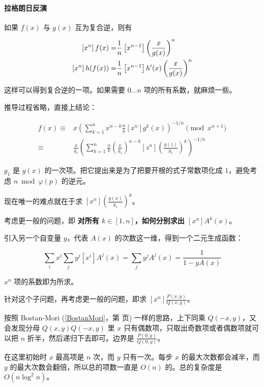 \paragraph{拉格朗日反演} 如果 $f(x)$ 与 $g(x)$ 互为复合逆，则有

$$ \begin{aligned}\relax \left[x^n\right]f(x)=&\frac{1}{n}\left[x^{n-1}\right]\left(\frac{x}{g(x)}\right)^n \\
\relax \left[x^n\right]h(f(x))=&\frac{1}{n}\left[x^{n-1}\right]h'(x)\left(\frac{x}{g(x)}\right)^n\end{aligned} $$

这样可以得到复合逆的一项。如果需要 $0 \dots n$ 项的所有系数，就麻烦一些。

推导过程省略，直接上结论：

$$ \begin{aligned}
f(x) \equiv & x \left( \sum_{k = 1} ^ n x^{n - k} \frac n k \left[ x^n \right] g^k(x) \right) ^ {- 1 / n} \pmod {x^{n + 1}} \\
\equiv & \frac x {g_1} \left( \sum_{k = 1} ^ n \frac n k \left( \frac x {g_1} \right) ^ {n - k} \left[ z^n \right] \left( \frac {g(z)} {g_1} \right) ^k \right) ^ {- 1 / n}
\end{aligned} $$

$g_1$ 是 $g(x)$ 的一次项。把它提出来是为了把要开根的式子常数项化成 $1$，避免考虑 $n \bmod \varphi(p)$ 的逆元。

现在唯一的难点就在于求 $[x^n] \left( \frac {g(x)} {g_1} \right) ^ k$。

考虑更一般的问题，即 \textbf{对所有 $k \in [1, n]$，如何分别求出 $[x^n] A^k(x)$}。

引入另一个自变量 $y$，代表 $A(x)$ 的次数这一维，得到一个二元生成函数：

$$ \sum_{i} x^i \sum_{j} y^j [x^i] A^j(x) = \sum_{j} y^j A^j(x) = \frac 1 {1 - y A(x)} $$

$x^n$ 项的系数即为所求。

针对这个子问题，再考虑更一般的问题，即求 $[x^n] \frac {P(x, y)} {Q(x, y)}$。

按照 Bostan-Mori (\ref{BostanMori}，第 \pageref{BostanMori} 页) 一样的思路，上下同乘 $Q(-x, y)$，又会发现分母 $Q(x, y) Q(-x, y)$ 里 $x$ 只有偶数项，只取出奇数项或者偶数项就可以把 $n$ 折半，然后递归下去即可。边界是 $\frac {P(0, y)} {Q(0, y)}$。

在这里初始时 $x$ 最高项是 $n$ 次，而 $y$ 只有一次。每步 $x$ 的最大次数都会减半，而 $y$ 的最大次数会翻倍，所以总的项数一直是 $O(n)$ 的。总的复杂度是 $O(n \log^2 n)$。


